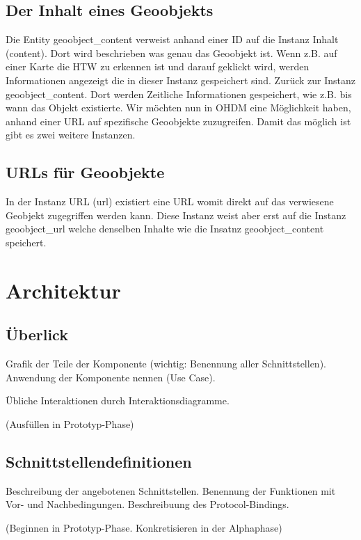 \subsection{Der Inhalt eines Geoobjekts}
Die Entity geoobject\_content verweist anhand einer ID auf die Instanz Inhalt (content). Dort wird beschrieben was genau das Geoobjekt ist. Wenn z.B. auf einer Karte die HTW zu erkennen ist und darauf geklickt wird, werden Informationen angezeigt die in dieser Instanz gespeichert sind. Zurück zur Instanz geoobject\_content. Dort werden Zeitliche Informationen gespeichert, wie z.B. bis wann das Objekt existierte. 
Wir möchten nun in OHDM eine Möglichkeit haben, anhand einer URL auf spezifische Geoobjekte zuzugreifen. Damit das möglich ist gibt es zwei weitere Instanzen.

\subsection{URLs für Geoobjekte}
In der Instanz URL (url) existiert eine URL womit direkt auf das verwiesene Geobjekt zugegriffen werden kann. Diese Instanz weist aber erst auf die Instanz geoobject\_url welche denselben Inhalte wie die Insatnz geoobject\_content speichert.

\section{Architektur}

\subsection{Überlick}
Grafik der Teile der Komponente (wichtig: Benennung aller Schnittstellen). 
Anwendung der Komponente nennen (Use Case).

Übliche Interaktionen durch Interaktionsdiagramme.

(Ausfüllen in Prototyp-Phase)

\subsection{Schnittstellendefinitionen}
Beschreibung der angebotenen Schnittstellen. Benennung der Funktionen
mit Vor- und Nachbedingungen. Beschreibuung des Protocol-Bindings.

(Beginnen in Prototyp-Phase. Konkretisieren in der Alphaphase)

